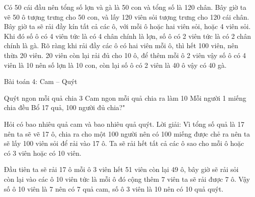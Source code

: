 \begin{multicols}{2}
	
	
	Có 50 cái đầu nên tổng số lợn và gà là 50 con và tổng số là 120 chân. Bây giờ ta vẽ 50 ô tượng trưng cho 50 con, và lấy 120 viên sỏi tượng trưng cho 120 cái chân.
	Bây giờ ta sẽ rải đầy kín tất cả các ô, với mỗi ô hoặc hai viên sỏi, hoặc 4 viên sỏi. Khi đó số ô có 4 viên tức là có 4 chân chính là lợn, số ô có 2 viên tức là có 2 chân chính là gà.
	Rõ ràng khi rải đầy các ô có hai viên mỗi ô, thì hết 100 viên, nên thừa 20 viên. 20 viên còn lại rải đủ cho 10 ô, để thêm mỗi ô 2 viên vậy số ô có 4 viên là 10 nên số lợn là 10 con, còn lại số ô có 2 viên là 40 ô vậy có 40 gà.
	
	
	Bài toán 4: Cam – Quýt
	
	
	
	Quýt ngon mỗi quả chia 3 Cam ngon mỗi quả chia ra làm 10
	Mỗi người 1 miếng chia đều Bổ 17 quả, 100 người đủ chia?"
	
	Hỏi có bao nhiêu quả cam và bao nhiêu quả quýt.
	Lời giải:
	Vì tổng số quả là 17 nên ta sẽ vẽ 17 ô, chia ra cho một 100 người nên có 100 miếng được chẻ ra nên ta sẽ lấy 100 viên sỏi để rải vào 17 ô.
	Ta sẽ rải hết tất cả các ô sao cho mỗi ô hoặc có 3 viên hoặc có 10 viên.
	
	Đầu tiên ta sẽ rải 17 ô mỗi ô 3 viên hết 51 viên còn lại 49 ô, bây giờ sẽ rải sỏi còn lại vào các ô 10 viên tức là mỗi ô đó cộng thêm 7 viên ta sẽ rải được 7 ô. Vậy số ô 10 viên là 7 nên có 7 quả cam, số ô 3 viên là 10 nên có 10 quả quýt.
	
	
	
	
	
	
	
	
	
	
	
	
	
	
	
	
	
	
	
	
	
	
	
	
	
	
	
	
	
	
	
	
	
	
	
	
	
	
	
	
	
	
	
	
	
	
	
	
	
	
	

\end{multicols}

